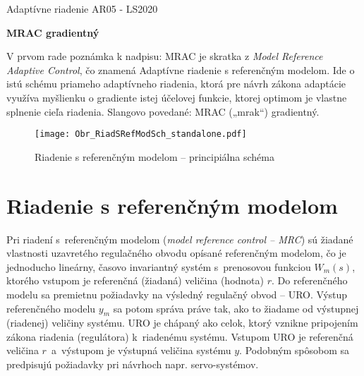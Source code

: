 \documentclass[a4paper, 10pt, ]{article}
\def\oznacenieCasti{AR05 - LS2020}
\begin{document}
\fontsize{12pt}{22pt}\selectfont

\centerline{\textsf{Adaptívne riadenie} \hfill \textsf{\oznacenieCasti}}

\fontsize{18pt}{22pt}\selectfont





\begin{flushleft}
	\textbf{\textsf{MRAC gradientný}}
\end{flushleft}





\normalsize

\bigskip

\tableofcontents

\bigskip

\vspace{18pt}






\noindent
V prvom rade poznámka k nadpisu: MRAC je skratka z \emph{Model Reference Adaptive Control}, čo znamená Adaptívne riadenie s referenčným modelom. Ide o istú schému priameho adaptívneho riadenia, ktorá pre návrh zákona adaptácie využíva myšlienku o gradiente istej účelovej funkcie, ktorej optimom je vlastne splnenie cieľa riadenia. Slangovo povedané: MRAC („mrak“) gradientný.








\begin{figure}[!b]
\centering

	\texttt{[image: Obr\_RiadSRefModSch\_standalone.pdf]}

	\caption{Riadenie s referenčným modelom -- principiálna schéma}
	\label{Riadenie s referenčným modelom --- principiálna schéma}

\end{figure}





\section{Riadenie s referenčným modelom}

Pri riadení s~referenčným modelom (\emph{model reference control -- MRC}) sú žiadané vlastnosti uzavretého regulačného obvodu opísané referenčným modelom, čo je jednoducho lineárny, časovo invariantný systém s~prenosovou funkciou $W_m(s)$, ktorého vstupom je referenčná (žiadaná) veličina (hodnota) $r$. Do referenčného modelu sa premietnu požiadavky na výsledný regulačný obvod -- URO. Výstup referenčného modelu $y_m$ sa potom správa práve tak, ako to žiadame od výstupnej (riadenej) veličiny systému.  URO je chápaný ako celok, ktorý vznikne pripojením zákona riadenia (regulátora) k~riadenému systému. Vstupom URO je referenčná veličina $r$~a~výstupom je výstupná veličina systému $y$. Podobným spôsobom sa predpisujú požiadavky pri návrhoch napr. servo-systémov.
\end{document}
